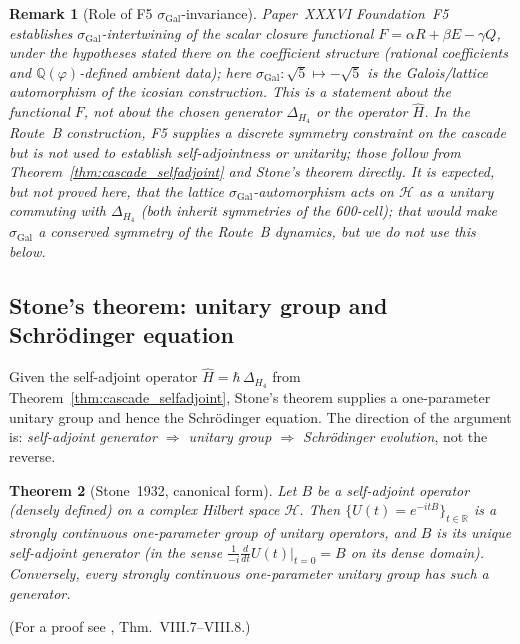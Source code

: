 \documentclass[12pt]{article}
\newtheorem{theorem}{Theorem}
\newtheorem{remark}[theorem]{Remark}
\newcommand{\sigmaG}{\sigma_{\mathrm{Gal}}}
\begin{document}
\begin{remark}[Role of F5 $\sigmaG$-invariance]\label{rem:F5_role}
Paper~XXXVI Foundation~F5 establishes $\sigmaG$-intertwining of the scalar closure functional $F = \alpha R + \beta E - \gamma Q$, under the hypotheses stated there on the coefficient structure (rational coefficients and $\mathbb{Q}(\varphi)$-defined ambient data); here $\sigmaG: \sqrt{5} \mapsto -\sqrt{5}$ is the Galois/lattice automorphism of the icosian construction. This is a statement about the functional $F$, not about the chosen generator $\Delta_{H_4}$ or the operator $\hat H$. In the Route~B construction, F5 supplies a discrete symmetry constraint on the cascade but is \emph{not} used to establish self-adjointness or unitarity; those follow from Theorem~\ref{thm:cascade_selfadjoint} and Stone's theorem directly. It is expected, but not proved here, that the lattice $\sigmaG$-automorphism acts on $\mathcal{H}$ as a unitary commuting with $\Delta_{H_4}$ (both inherit symmetries of the 600-cell); that would make $\sigmaG$ a conserved symmetry of the Route~B dynamics, but we do not use this below.
\end{remark}

\subsection{Stone's theorem: unitary group and Schr\"odinger equation}\label{subsec:stone}

Given the self-adjoint operator $\hat H = \hbar\,\Delta_{H_4}$ from Theorem~\ref{thm:cascade_selfadjoint}, Stone's theorem supplies a one-parameter unitary group and hence the Schr\"odinger equation. The direction of the argument is: \emph{self-adjoint generator $\Rightarrow$ unitary group $\Rightarrow$ Schr\"odinger evolution}, not the reverse.

\begin{theorem}[Stone~1932, canonical form]\label{thm:stone}
Let $B$ be a self-adjoint operator (densely defined) on a complex Hilbert space $\mathcal{H}$. Then $\{U(t) = e^{-itB}\}_{t \in \mathbb{R}}$ is a strongly continuous one-parameter group of unitary operators, and $B$ is its unique self-adjoint generator (in the sense $\tfrac{1}{-i}\frac{d}{dt}U(t)\big|_{t=0} = B$ on its dense domain). Conversely, every strongly continuous one-parameter unitary group has such a generator.
\end{theorem}

(For a proof see \citep{ReedSimon1980}, Thm.~VIII.7--VIII.8.)
\end{document}
